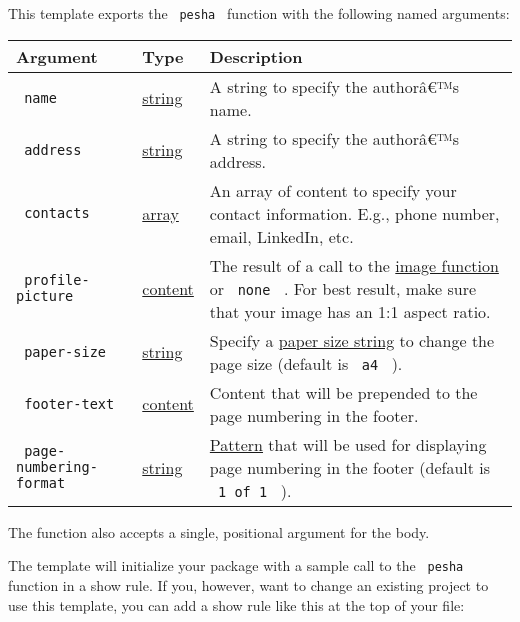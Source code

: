 This template exports the \texttt{\ pesha\ } function with the following
named arguments:

\begin{longtable}[]{@{}lll@{}}
\toprule\noalign{}
Argument & Type & Description \\
\midrule\noalign{}
\endhead
\bottomrule\noalign{}
\endlastfoot
\texttt{\ name\ } &
\href{https://typst.app/docs/reference/foundations/str/}{string} & A
string to specify the authorâ€™s name. \\
\texttt{\ address\ } &
\href{https://typst.app/docs/reference/foundations/str/}{string} & A
string to specify the authorâ€™s address. \\
\texttt{\ contacts\ } &
\href{https://typst.app/docs/reference/foundations/array/}{array} & An
array of content to specify your contact information. E.g., phone
number, email, LinkedIn, etc. \\
\texttt{\ profile-picture\ } &
\href{https://typst.app/docs/reference/foundations/content/}{content} &
The result of a call to the
\href{https://typst.app/docs/reference/visualize/image/}{image function}
or \texttt{\ none\ } . For best result, make sure that your image has an
1:1 aspect ratio. \\
\texttt{\ paper-size\ } &
\href{https://typst.app/docs/reference/foundations/str/}{string} &
Specify a
\href{https://typst.app/docs/reference/layout/page\#parameters-paper}{paper
size string} to change the page size (default is \texttt{\ a4\ } ). \\
\texttt{\ footer-text\ } &
\href{https://typst.app/docs/reference/foundations/content/}{content} &
Content that will be prepended to the page numbering in the footer. \\
\texttt{\ page-numbering-format\ } &
\href{https://typst.app/docs/reference/foundations/str/}{string} &
\href{https://typst.app/docs/reference/model/numbering/\#parameters-numbering}{Pattern}
that will be used for displaying page numbering in the footer (default
is \texttt{\ 1\ of\ 1\ } ). \\
\end{longtable}

The function also accepts a single, positional argument for the body.

The template will initialize your package with a sample call to the
\texttt{\ pesha\ } function in a show rule. If you, however, want to
change an existing project to use this template, you can add a show rule
like this at the top of your file:

